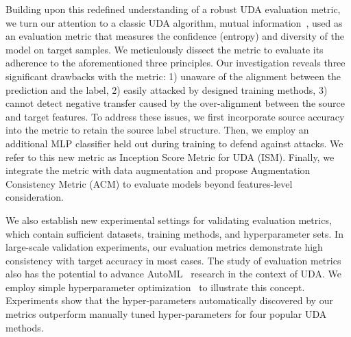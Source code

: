 \documentclass{article} %
\begin{document}
Building upon this redefined understanding of a robust UDA evaluation metric, we turn our attention to a classic UDA algorithm, mutual information~\cite{C-Ent,MI}, used as an evaluation metric that measures the confidence (entropy) and diversity of the model on target samples. We meticulously dissect the metric to evaluate its adherence to the aforementioned three principles. Our investigation reveals three significant drawbacks with the metric: 1) unaware of the alignment between the prediction and the label, 2) easily attacked by designed training methods, 3) cannot detect negative transfer caused by the over-alignment between the source and target features. 
To address these issues, we first incorporate source accuracy into the metric to retain the source label structure. Then, we 
employ an additional MLP classifier held out during training to defend against attacks. We refer to this new metric as Inception Score Metric for UDA (ISM). Finally, we integrate the metric with data augmentation and propose Augmentation Consistency Metric (ACM) to evaluate models beyond features-level consideration.

We also establish new experimental settings for validating evaluation metrics, which contain sufficient datasets, training methods, and hyperparameter sets. In large-scale validation experiments, our evaluation metrics demonstrate high consistency with target accuracy in most cases.
The study of evaluation metrics also has the potential to advance AutoML~\cite{NAS,ENAS} research in the context of UDA. We employ simple hyperparameter optimization~\cite{Optuna} to illustrate this concept. Experiments show that the hyper-parameters automatically discovered by our metrics outperform manually tuned hyper-parameters for four popular UDA methods.

\end{document}
